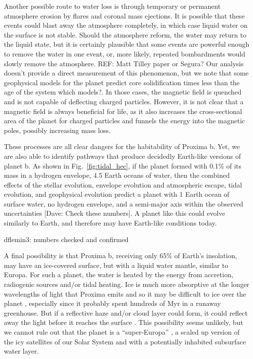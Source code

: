 \documentclass[preprint,12pt]{aastex}
\newcommand{\xxx}[1]{{\color{red} #1}} %
\def\eg{{\it e.g.\ }}
\begin{document}
Another possible route to water loss is through temporary or permanent
atmosphere erosion by flares and coronal mass ejections. It is
possible that these events could blast away the atmosphere completely,
in which case liquid water on the surface is not stable. Should the
atmosphere reform, the water may return to the liquid state, but it is
certainly plausible that some events are powerful enough to remove the
water in one event, or, more likely, repeated bombardments would
slowly remove the atmosphere. \xxx{REF: Matt Tilley paper or Segura?} Our analysis doesn't provide a direct
measurement of this phenomenon, but we note that some geophysical
models for the planet predict core solidification times less than the
age of the system \xxx{which models?}. In those cases, the magnetic field is quenched and
is not capable of deflecting charged particles. However, it is not
clear that a magnetic field is always beneficial for life, as it also
increases the cross-sectional area of the planet for charged particles
and funnels the energy into the magnetic poles, possibly increasing
mass loss.

These processes are all clear dangers for the habitability of Proxima
b. Yet, we are also able to identify pathways that produce decidedly
Earth-like versions of planet b. \xxx{As shown in Fig.~\ref{fig:tidal_hec},
if the planet formed with 0.1\% of its mass in a hydrogen envelope, 4.5
Earth oceans of water, then the combined effects of the stellar
evolution, envelope evolution and atmospheric escape, tidal evolution,
and geophysical evolution predict a planet with 1 Earth ocean of
surface water, no hydrogen envelope, and a semi-major axis within the
observed uncertainties [Dave: Check these numbers]}. A planet like this could evolve similarly to
Earth, and therefore may have Earth-like conditions today.

\xxx{dflemin3: numbers checked and confirmed}

A final possibility is that Proxima b, receiving only 65\% of Earth's
insolation, may have an ice-covered surface, but with a liquid water
mantle, similar to Europa. For such a planet, the water is heated by
the energy from accretion, radiogenic sources and/or tidal
heating. Ice is much more absorptive at the longer wavelengths of
light that Proxima emits and so it may be difficult to ice over the
planet \citep{JoshiHaberle12,Shields13}, especially since it probably spent
hundreds of Myr in a runaway greenhouse. But if a reflective haze
and/or cloud layer could form, it could reflect away the light before
it reaches the surface \citep[\eg][]{Arney16}. This possibility seems unlikely, but we cannot
rule out that the planet is a ``super-Europa'' \citep{BarnesHeller13},
a scaled up version of the icy satellites of our Solar System and with
a potentially inhabited subsurface water layer.
\end{document}
